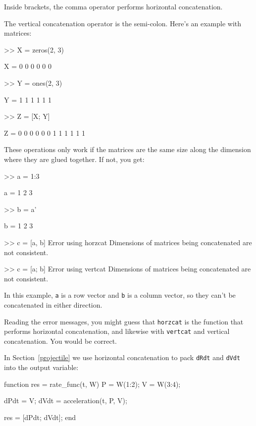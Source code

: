 Inside brackets, the comma operator performs horizontal concatenation.

The vertical concatenation operator is the semi-colon.  Here's an
example with matrices:


\begin{code}
>> X = zeros(2, 3)

X =  0     0     0
     0     0     0

>> Y = ones(2, 3)

Y =  1     1     1
     1     1     1

>> Z = [X; Y]

Z =  0     0     0
     0     0     0
     1     1     1
     1     1     1
\end{code}

These operations only work if the matrices are the same size along
the dimension where they are glued together.  If not, you get:

\begin{code}
>> a = 1:3

a = 1     2     3

>> b = a'

b =  1
     2
     3

>> c = [a, b]
Error using horzcat
Dimensions of matrices being concatenated are not consistent.

>> c = [a; b]
Error using vertcat
Dimensions of matrices being concatenated are not consistent.
\end{code}

In this example, {\tt a} is a row vector and {\tt b} is a column
vector, so they can't be concatenated in either direction.

Reading the error messages, you might guess that {\tt horzcat}
is the function that performs horizontal concatenation, and likewise
with {\tt vertcat} and vertical concatenation.  You would be correct.


In Section~\ref{projectile} we use horizontal concatenation to pack {\tt dRdt} and {\tt dVdt} into the output variable:

\begin{code}
function res = rate_func(t, W)
    P = W(1:2);
    V = W(3:4);

    dPdt = V;
    dVdt = acceleration(t, P, V);

    res = [dPdt; dVdt];
end
\end{code}

